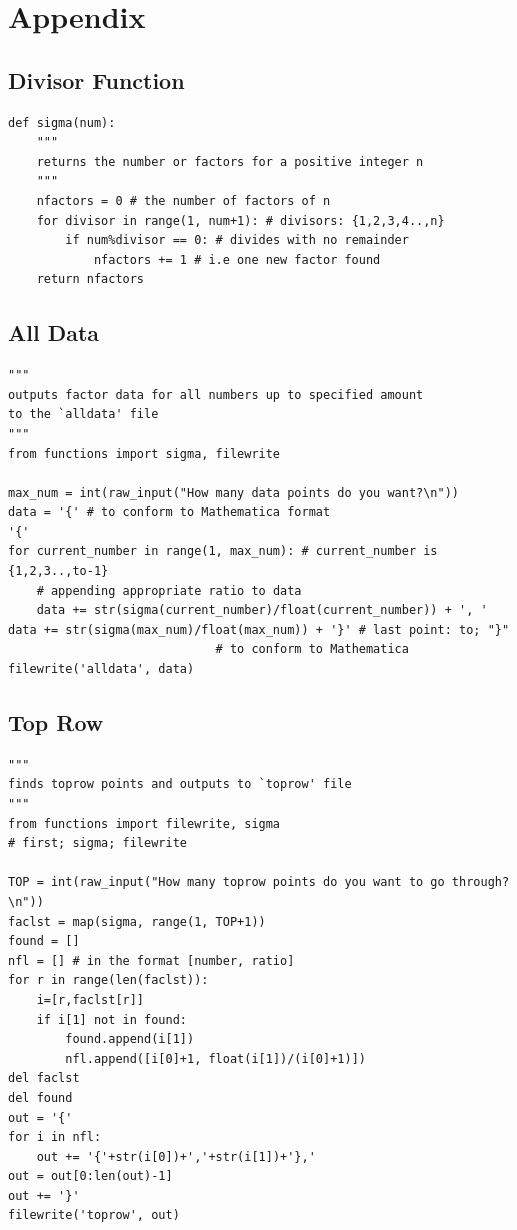 \documentclass[12pt]{article}
\begin{document}
\newpage
\singlespacing
	\section{Appendix}
			\subsection{Divisor Function\label{divfun}}
				\begin{verbatim}
def sigma(num):
	"""
	returns the number or factors for a positive integer n
	"""
	nfactors = 0 # the number of factors of n
	for divisor in range(1, num+1): # divisors: {1,2,3,4..,n}
		if num%divisor == 0: # divides with no remainder
			nfactors += 1 # i.e one new factor found
	return nfactors
				\end{verbatim}
			\subsection{All Data}
				\begin{verbatim}
"""
outputs factor data for all numbers up to specified amount
to the `alldata' file
"""
from functions import sigma, filewrite

max_num = int(raw_input("How many data points do you want?\n"))
data = '{' # to conform to Mathematica format															 '{'
for current_number in range(1, max_num): # current_number is {1,2,3..,to-1}
    # appending appropriate ratio to data
    data += str(sigma(current_number)/float(current_number)) + ', '
data += str(sigma(max_num)/float(max_num)) + '}' # last point: to; "}"
					         # to conform to Mathematica
filewrite('alldata', data)
				\end{verbatim}
			\subsection{Top Row\label{TopRowCode}}
				\begin{verbatim}
"""
finds toprow points and outputs to `toprow' file
"""
from functions import filewrite, sigma
# first; sigma; filewrite

TOP = int(raw_input("How many toprow points do you want to go through?\n"))
faclst = map(sigma, range(1, TOP+1))
found = []
nfl = [] # in the format [number, ratio]
for r in range(len(faclst)):
    i=[r,faclst[r]]
    if i[1] not in found:
        found.append(i[1])
        nfl.append([i[0]+1, float(i[1])/(i[0]+1)])
del faclst
del found
out = '{'
for i in nfl:
    out += '{'+str(i[0])+','+str(i[1])+'},'
out = out[0:len(out)-1]
out += '}'
filewrite('toprow', out)
				\end{verbatim}
\end{document}
